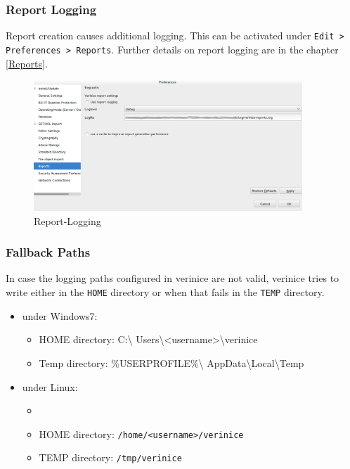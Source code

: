 \documentclass[a4paper,10pt]{book}
\begin{document}
\subsubsection{Report Logging}
\label{sec:report-logging}

Report creation causes additional logging.  This can be activated
under \texttt{Edit > Preferences > Reports}. Further details on report
logging are in the chapter \ref{Reports}.

\begin{figure}[ht]
  \centering
  \includegraphics[width=0.9\textwidth]{Screenshot/report-logging.png}
  \caption{Report-Logging}
  \label{fig:report-logging}
\end{figure}

\subsubsection{Fallback Paths}
\label{sec:fallback-path}

In case the logging paths configured in verinice are not valid,
verinice tries to write either in the \texttt{HOME} directory or when
that fails in the \texttt{TEMP} directory.

\begin{itemize}
\item under Windows7:
  \begin{itemize}
  \item HOME directory: C:\textbackslash
    Users\textbackslash<username>\textbackslash verinice
  \item Temp directory: \%USERPROFILE\%\textbackslash
    AppData\textbackslash Local\textbackslash Temp
  \end{itemize}
\item  under Linux:
  \begin{itemize}
  \item \item HOME directory: \texttt{/home/<username>/verinice}
  \item TEMP directory: \texttt{/tmp/verinice}
  \end{itemize}

\end{itemize}
\end{document}
